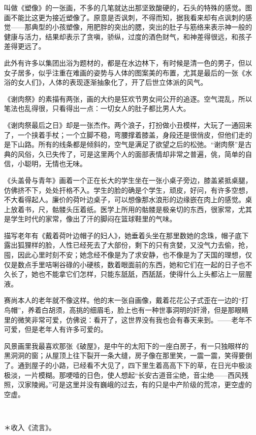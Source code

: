 \par 叫做《塑像》的一张画，不多的几笔就达出那坚致酸硬的，石头的特殊的感觉。图画不能比这更为接近塑像了。原意是否讽刺，不得而知，据我看来却有点讽刺的感觉——那典型的小孩塑像，用肥胖的突出的腮，突出的肚子与筋络来表示神一般的健康与活力，结果却表示了贪嗔，骄纵，过度的酒色财气，和神差得很远，和孩子差得更远了。
\par 此外有许多以集团出浴为题材的，都是在水边林下，有时候是清一色的男子，但以女子居多，似乎注重在难画的姿势与人体的图案美的布置，尤其是最后的一张《水浴的女人们》，人体的表现逐渐抽象化了，开了后世立体派的风气。
\par 《谢肉祭》的素描有两张，画的大约是狂欢节男女间公开的追逐。空气混乱，所以笔法也乱得很，只看得出一点：一切女人的肚子都比男人大。
\par 《谢肉祭最后之日》却是一张杰作。两个浪子，打扮做小丑模样，大玩了一通回来了，一个挟着手杖；一个立脚不稳，弯腰撑着膝盖，身段还是很俏皮，但他们走的是下山路。所有的线条都是倾斜的，空气是满足了欲望之后的松弛。“谢肉祭”是古典的风俗，久已失传了，可是这里两个人的面部表情却非常之普遍，佻，简单的自信，小聪明，无情也无味。
\par 《头盖骨与青年》画着一个正在长大的学生坐在一张小桌子旁边，膝盖紧抵桌腿，仿佛挤不下，处处扞格不入。学生的脸的确是个学生，顽皮，好问，有许多空想，不大看得起人。廉价的荷叶边桌子，可以想像那水浪形的边缘嵌在肉上的感觉。桌上放着书，尺，骷髅头压着纸。医学上所用的骷髅是极亲切的东西，很家常，尤其是学生时代的家常，像出了汗的脚闷在篮球鞋里的气味。
\par 描写老年有《戴着荷叶边帽子的妇人》，她垂着头坐在那里数她的念珠，帽子底下露出狐狸样的脸，人性已经死去了大部份，剩下的只有贪婪，又没气力去偷，抢，囤，因此心里时刻不安；她念经不像是为了求安静，也不像是为了天国的理想，仅仅是数点手里咭唎谷碌的小硬核，数着眼面前的东西，她和它们在一起的日子也不久长了，她也不能拿它们怎样，只能东舐舐，西舐舐，使得什么上头都沾上一层腥液。
\par 赛尚本人的老年就不像这样。他的末一张自画像，戴着花花公子式歪在一边的“打鸟帽”，养着白胡须，高挑的细眉毛，脸上也有一种世事洞明的奸滑，但是那眼睛里的微笑非常可爱，仿佛说：看开了，这世界没有我也会有春天来到。——老年不可爱，但是老年人有许多可爱的。
\par 风景画里我最喜欢那张《破屋》，是中午的太阳下的一座白房子，有一只独眼样的黑洞洞的窗；从屋顶上往下裂开一条大缝，房子像在那里笑，一震一震，笑得要倒了。通到屋子的小路，已经看不大见了，四下里生着高高下下的草，在日光中极淡极淡，一片模糊。那哽噎的日色，使人想起“长安古道音尘绝，音尘绝——西风残照，汉家陵阙。”可是这里并没有巍峨的过去，有的只是中产阶级的荒凉，更空虚的空虚。
\par  
\par ＊收入《流言》。


